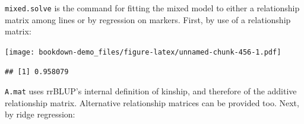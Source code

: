 \documentclass[
]{book}
\newenvironment{Shaded}{\begin{snugshade}}{\end{snugshade}}
\newcommand{\AttributeTok}[1]{\textcolor[rgb]{0.77,0.63,0.00}{#1}}
\newcommand{\ConstantTok}[1]{\textcolor[rgb]{0.00,0.00,0.00}{#1}}
\newcommand{\DecValTok}[1]{\textcolor[rgb]{0.00,0.00,0.81}{#1}}
\newcommand{\FloatTok}[1]{\textcolor[rgb]{0.00,0.00,0.81}{#1}}
\newcommand{\FunctionTok}[1]{\textcolor[rgb]{0.00,0.00,0.00}{#1}}
\newcommand{\NormalTok}[1]{#1}
\newcommand{\OtherTok}[1]{\textcolor[rgb]{0.56,0.35,0.01}{#1}}
\newcommand{\SpecialCharTok}[1]{\textcolor[rgb]{0.00,0.00,0.00}{#1}}
\newcommand{\StringTok}[1]{\textcolor[rgb]{0.31,0.60,0.02}{#1}}
\begin{document}
\texttt{mixed.solve} is the command for fitting the mixed model to either a relationship matrix
among lines or by regression on markers. First, by use of a relationship matrix:

\begin{Shaded}
\end{Shaded}

\texttt{[image: bookdown-demo\_files/figure-latex/unnamed-chunk-456-1.pdf]}

\begin{Shaded}
\end{Shaded}

\begin{verbatim}
## [1] 0.958079
\end{verbatim}

\texttt{A.mat} uses rrBLUP's internal definition of kinship, and therefore of the additive relationship matrix. Alternative relationship matrices can be provided too. Next, by ridge regression:

\begin{Shaded}
\end{Shaded}
\end{document}
